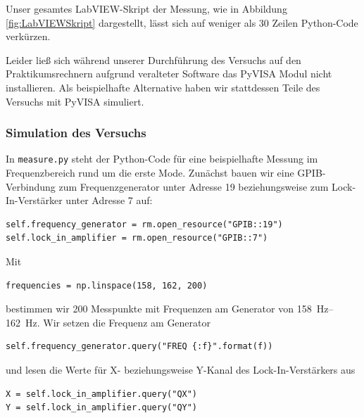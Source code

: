 Unser gesamtes LabVIEW-Skript der Messung, wie in Abbildung \ref{fig:LabVIEWSkript} dargestellt, lässt sich auf weniger als 30 Zeilen Python-Code verkürzen.

Leider ließ sich während unserer Durchführung des Versuchs auf den Praktikumsrechnern aufgrund veralteter Software das PyVISA Modul nicht installieren.
Als beispielhafte Alternative haben wir stattdessen Teile des Versuchs mit PyVISA simuliert.

\subsubsection*{Simulation des Versuchs}

In \texttt{measure.py} steht der Python-Code für eine beispielhafte Messung im Frequenzbereich rund um die erste Mode.
Zunächst bauen wir eine GPIB-Verbindung zum Frequenzgenerator unter Adresse 19 beziehungsweise zum Lock-In-Verstärker unter Adresse 7 auf:
\begin{small}
\begin{lstlisting}[xleftmargin=10mm,numbers=none]
self.frequency_generator = rm.open_resource("GPIB::19")
self.lock_in_amplifier = rm.open_resource("GPIB::7")
\end{lstlisting}
\end{small}

Mit
\begin{small}
\begin{lstlisting}[xleftmargin=10mm,numbers=none]
frequencies = np.linspace(158, 162, 200)
\end{lstlisting}
\end{small}

bestimmen wir 200 Messpunkte mit Frequenzen am Generator von \SIrange{158}{162}{\hertz}. Wir setzen die Frequenz am Generator
\begin{small}
\begin{lstlisting}[xleftmargin=10mm,numbers=none]
self.frequency_generator.query("FREQ {:f}".format(f))
\end{lstlisting}
\end{small}

und lesen die Werte für X- beziehungsweise Y-Kanal des Lock-In-Verstärkers aus
\begin{small}
\begin{lstlisting}[xleftmargin=10mm,numbers=none]
X = self.lock_in_amplifier.query("QX")
Y = self.lock_in_amplifier.query("QY")
\end{lstlisting}
\end{small}

